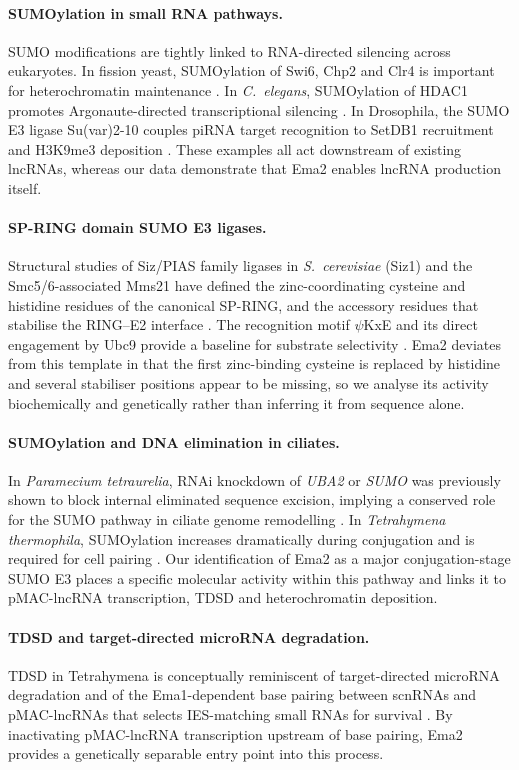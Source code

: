 \paragraph{SUMOylation in small RNA pathways.}
SUMO modifications are tightly linked to RNA-directed silencing across
eukaryotes. In fission yeast, SUMOylation of Swi6, Chp2 and Clr4 is
important for heterochromatin maintenance \citep{shin2005sumo}. In
\emph{C.~elegans}, SUMOylation of HDAC1 promotes Argonaute-directed
transcriptional silencing \citep{kim2021hdac1}. In Drosophila, the SUMO E3
ligase Su(var)2-10 couples piRNA target recognition to SetDB1 recruitment
and H3K9me3 deposition \citep{ninova2019suvar}. These examples all act
downstream of existing lncRNAs, whereas our data demonstrate that Ema2
enables lncRNA production itself.

\paragraph{SP-RING domain SUMO E3 ligases.}
Structural studies of Siz/PIAS family ligases in \emph{S.~cerevisiae}
(Siz1) and the Smc5/6-associated Mms21 have defined the zinc-coordinating
cysteine and histidine residues of the canonical SP-RING, and the accessory
residues that stabilise the RING--E2 interface
\citep{yunus2009siz1,duan2009mms21,hochstrasser2001spring}. The recognition
motif $\psi$KxE and its direct engagement by Ubc9 provide a baseline for
substrate selectivity \citep{sampson2001sumo}. Ema2 deviates from this
template in that the first zinc-binding cysteine is replaced by histidine
and several stabiliser positions appear to be missing, so we analyse its
activity biochemically and genetically rather than inferring it from sequence
alone.

\paragraph{SUMOylation and DNA elimination in ciliates.}
In \emph{Paramecium tetraurelia}, RNAi knockdown of \emph{UBA2} or \emph{SUMO}
was previously shown to block internal eliminated sequence excision, implying
a conserved role for the SUMO pathway in ciliate genome remodelling
\citep{matsuda2006sumo}. In \emph{Tetrahymena thermophila}, SUMOylation
increases dramatically during conjugation and is required for cell pairing
\citep{nasir2015sumo}. Our identification of Ema2 as a major conjugation-stage
SUMO E3 places a specific molecular activity within this pathway and links
it to pMAC-lncRNA transcription, TDSD and heterochromatin deposition.

\paragraph{TDSD and target-directed microRNA degradation.}
TDSD in Tetrahymena is conceptually reminiscent of target-directed microRNA
degradation and of the Ema1-dependent base pairing between scnRNAs and
pMAC-lncRNAs that selects IES-matching small RNAs for survival
\citep{aronica2008ema1,schoeberl2012biased}. By inactivating pMAC-lncRNA
transcription upstream of base pairing, Ema2 provides a genetically separable
entry point into this process.
